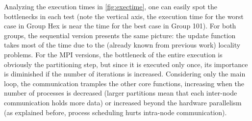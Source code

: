 Analyzing the execution times in \cref{fig:exectime}, one can easily spot the bottlenecks in each test (note the vertical axis, the execution time for the worst case in Group Hex is near the time for the best case in Group 101). For both groups, the sequential version presents the same picture: the update function takes most of the time due to the (already known from previous work) locality problems. For the MPI versions, the bottleneck of the entire execution is obviously the partitioning step, but since it is executed only once, its importance is diminished if the number of iterations is increased. Considering only the main loop, the communication tramples the other core functions, increasing when the number of processes is decreased (larger partitions mean that each inter-node communication holds more data) or increased beyond the hardware parallelism (as explained before, process scheduling hurts intra-node communication).

